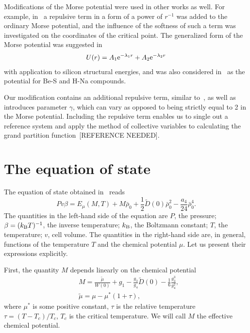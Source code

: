 \documentclass[12pt]{article}
\begin{document}
	Modifications of the Morse potential were used in other works as well. For example, in~\cite{MartinezValenciaEtAl2013} a repulsive term in a form of a power of $r^{-1}$ was added to the ordinary Morse potential, and the influence of the softness of such a term was investigated on the coordinates of the critical point. The generalized form of the Morse potential was suggested in~\cite{BiswasHamann1985}
	\begin{equation}
		U(r) = A_1 {\rm e}^{-\lambda_1 r} + A_2 {\rm e}^{-\lambda_2 r}
	\end{equation} 
	with application to silicon structural energies, and was also considered in~\cite{Lim2005} as the potential for Be-S and H-Na compounds.
	
	Our modification contains an additional repulsive term, similar to~\cite{MartinezValenciaEtAl2013}, as well as introduces parameter $\gamma$, which can vary as opposed to being strictly equal to 2 in the Morse potential. Including the repulsive term enables us to single out a reference system and apply the method of collective variables to calculating the grand partition function~[REFERENCE NEEDED].
	
	\section{The equation of state}
	The equation of state obtained in~\cite[see Eq.(42)]{KozlovskiiDobush2020} reads
	\begin{equation}
		\label{eq:eosMT}
		Pv\beta = E_\mu(M, T) + M \bar \rho_0 + \frac{1}{2} \tilde D(0) \bar \rho_0^2 - \frac{a_4}{24} \bar \rho_0^4.
	\end{equation}
	The quantities in the left-hand side of the equation are $P$, the pressure; $\beta = (k_{\rm B} T)^{-1}$, the inverse temperature; $k_{\rm B}$, the Boltzmann constant; $T$, the temperature; $v$, cell volume. The quantities in the right-hand side are, in general, functions of the temperature $T$ and the chemical potential $\mu$. Let us present their expressions explicitly.
	
	First, the quantity $M$ depends linearly on the chemical potential
	\begin{align}\label{chem_pot}
		&	M = \frac{\tilde\mu}{W(0)} + g_1 - \frac{g_3}{g_4} \tilde D(0) - \frac{1}{6} \frac{g_3^3}{g_4^2}, \\
		&	\tilde\mu=\mu-\mu^*(1+\tau),
	\end{align}
	where $\mu^*$ is some positive constant, $\tau$ is the relative temperature $\tau = (T - T_c) / T_c$, $T_c$ is the critical temperature. We will call $M$ the effective chemical potential.
	
\end{document}
